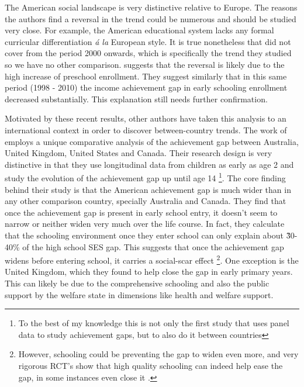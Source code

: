 \documentclass[11pt, a4paper]{article}\usepackage[]{graphicx}\usepackage[]{color}
\begin{document}
The American social landscape is very distinctive relative to Europe. The reasons the authors find a reversal in the trend could be numerous and should be studied very close. For example, the American educational system lacks any formal curricular differentiation \emph{\'a la} European style. It is true nonetheless that \citet{reardon2011} did not cover from the period 2000 onwards, which is specifically the trend they studied so we have no other comparison. \citet{reardon_portilla} suggests that the reversal is likely due to the high increase of preschool enrollment. They suggest similarly that in this same period (1998 - 2010) the income achievement gap in early schooling enrollment decreased substantially. This explanation still needs further confirmation.

Motivated by these recent results, other authors have taken this analysis to an international context in order to discover between-country trends. The work of \citet{bradbury2015} employs a unique comparative analysis of the achievement gap between Australia, United Kingdom, United States and Canada. Their research design is very distinctive in that they use longitudinal data from children as early as age 2 and study the evolution of the achievement gap up until age 14 \footnote{To the best of my knowledge this is not only the first study that uses panel data to study achievement gaps, but to also do it between countries}. The core finding behind their study is that the American achievement gap is much wider than in any other comparison country, specially Australia and Canada. They find that once the achievement gap is present in early school entry, it doesn't seem to narrow or neither widen very much over the life course. In fact, they calculate that the schooling environment once they enter school can only explain about \~ 30-40\% of the high school SES gap. This suggests that once the achievement gap widens before entering school, it carries a social-scar effect \footnote{However, schooling could be preventing the gap to widen even more, and very rigorous RCT's show that high quality schooling can indeed help ease the gap, in some instances even close it \citep{campbell2002}.}. One exception is the United Kingdom, which they found to help close the gap in early primary years. This can likely be due to the comprehensive schooling and also the public support by the welfare state in dimensions like health and welfare support.
\end{document}
